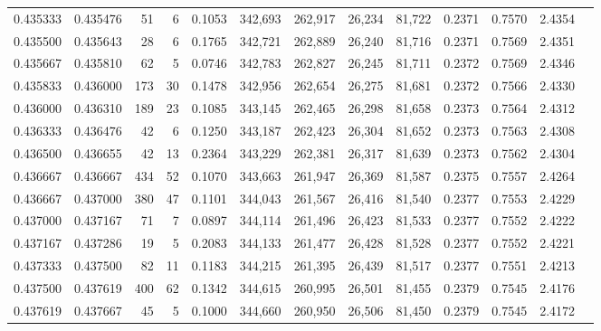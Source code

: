 \begin{tabular}{rrrrrrrrrrrrr}
0.435333 & 0.435476 &    51 &   6 &                                     0.1053 & 342,693 & 262,917 &  26,234 &  81,722 & 0.2371 & 0.7570 & 2.4354 \\
0.435500 & 0.435643 &    28 &   6 &                                     0.1765 & 342,721 & 262,889 &  26,240 &  81,716 & 0.2371 & 0.7569 & 2.4351 \\
0.435667 & 0.435810 &    62 &   5 &                                     0.0746 & 342,783 & 262,827 &  26,245 &  81,711 & 0.2372 & 0.7569 & 2.4346 \\
0.435833 & 0.436000 &   173 &  30 &                                     0.1478 & 342,956 & 262,654 &  26,275 &  81,681 & 0.2372 & 0.7566 & 2.4330 \\
0.436000 & 0.436310 &   189 &  23 &                                     0.1085 & 343,145 & 262,465 &  26,298 &  81,658 & 0.2373 & 0.7564 & 2.4312 \\
0.436333 & 0.436476 &    42 &   6 &                                     0.1250 & 343,187 & 262,423 &  26,304 &  81,652 & 0.2373 & 0.7563 & 2.4308 \\
0.436500 & 0.436655 &    42 &  13 &                                     0.2364 & 343,229 & 262,381 &  26,317 &  81,639 & 0.2373 & 0.7562 & 2.4304 \\
0.436667 & 0.436667 &   434 &  52 &                                     0.1070 & 343,663 & 261,947 &  26,369 &  81,587 & 0.2375 & 0.7557 & 2.4264 \\
0.436667 & 0.437000 &   380 &  47 &                                     0.1101 & 344,043 & 261,567 &  26,416 &  81,540 & 0.2377 & 0.7553 & 2.4229 \\
0.437000 & 0.437167 &    71 &   7 &                                     0.0897 & 344,114 & 261,496 &  26,423 &  81,533 & 0.2377 & 0.7552 & 2.4222 \\
0.437167 & 0.437286 &    19 &   5 &                                     0.2083 & 344,133 & 261,477 &  26,428 &  81,528 & 0.2377 & 0.7552 & 2.4221 \\
0.437333 & 0.437500 &    82 &  11 &                                     0.1183 & 344,215 & 261,395 &  26,439 &  81,517 & 0.2377 & 0.7551 & 2.4213 \\
0.437500 & 0.437619 &   400 &  62 &                                     0.1342 & 344,615 & 260,995 &  26,501 &  81,455 & 0.2379 & 0.7545 & 2.4176 \\
0.437619 & 0.437667 &    45 &   5 &                                     0.1000 & 344,660 & 260,950 &  26,506 &  81,450 & 0.2379 & 0.7545 & 2.4172 \\

\end{tabular}
